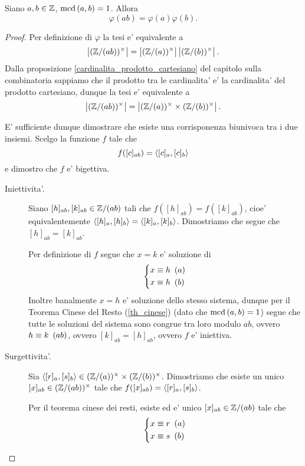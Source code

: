 \begin{proposition}
    Siano $a, b \in \mathbb{Z}$, $\operatorname{mcd}\left(a, b\right) = 1$. Allora \begin{equation}
        \varphi(ab) = \varphi(a)\varphi(b).
    \end{equation}
\end{proposition}
\begin{proof}
    Per definizione di $\varphi$ la tesi e' equivalente a \[
        \left|(\mathbb{Z}/(ab))^{\times}\right| = \left|(\mathbb{Z}/(a))^{\times}\right|\left|(\mathbb{Z}/(b))^{\times}\right|.
    \]
    Dalla proposizione \ref{cardinalita_prodotto_cartesiano} del capitolo sulla combinatoria sappiamo che il prodotto tra le cardinalita' e' la cardinalita' del prodotto cartesiano, dunque la tesi e' equivalente a \[
        \left|(\mathbb{Z}/(ab))^{\times}\right| = \left|(\mathbb{Z}/(a))^{\times}\times(\mathbb{Z}/(b))^{\times}\right|.
    \]

    E' sufficiente dunque dimostrare che esiste una corrisponenza biunivoca tra i due insiemi. Scelgo la funzione $f$ tale che \[
        f([c]_{ab}) = \left\langle [c]_a, [c]_b \right\rangle    
    \] e dimostro che $f$ e' bigettiva.

    \begin{description}
        \item[Iniettivita'.] Siano $[h]_{ab}, [k]_{ab} \in \mathbb{Z}/(ab)$ tali che $f([h]_{ab}) = f([k]_{ab})$, cioe' equivalentemente $\left\langle [h]_a, [h]_b \right\rangle = \left\langle [k]_a, [k]_b \right\rangle$. Dimostriamo che segue che $[h]_{ab} = [k]_{ab}$.
        
        Per definizione di $f$ segue che $x = k$ e' soluzione di \[
            \left\{
            \begin{alignedat}{1}
                &x \equiv h \ \left(a\right)\\
                &x \equiv h \ \left(b\right)
            \end{alignedat}
            \right.   
        \] Inoltre banalmente $x = h$ e' soluzione dello stesso sistema, dunque per il Teorema Cinese del Resto (\ref{th_cinese}) (dato che $\operatorname{mcd}\left(a, b\right) = 1$) segue che tutte le soluzioni del sistema sono congrue tra loro modulo $ab$, ovvero $h \equiv k \ \left(ab\right)$, ovvero $[k]_{ab} = [h]_{ab}$, ovvero $f$ e' iniettiva.
        \item[Surgettivita'.] Sia $\left\langle [r]_a, [s]_b \right\rangle \in (\mathbb{Z}/(a))^{\times}\times(\mathbb{Z}/(b))^{\times}$. Dimostriamo che esiste un unico $[x]_{ab} \in (\mathbb{Z}/(ab))^{\times}$ tale che $f([x]_{ab}) = \left\langle [r]_a, [s]_b \right\rangle$.
        
        Per il teorema cinese dei resti, esiste ed e' unico $[x]_{ab} \in \mathbb{Z}/(ab)$ tale che \[
            \left\{
            \begin{alignedat}{1}
                &x \equiv r \ \left(a\right)\\
                &x \equiv s \ \left(b\right)
            \end{alignedat}
            \right.   
        \] 
        

\end{description}
\end{proof}
